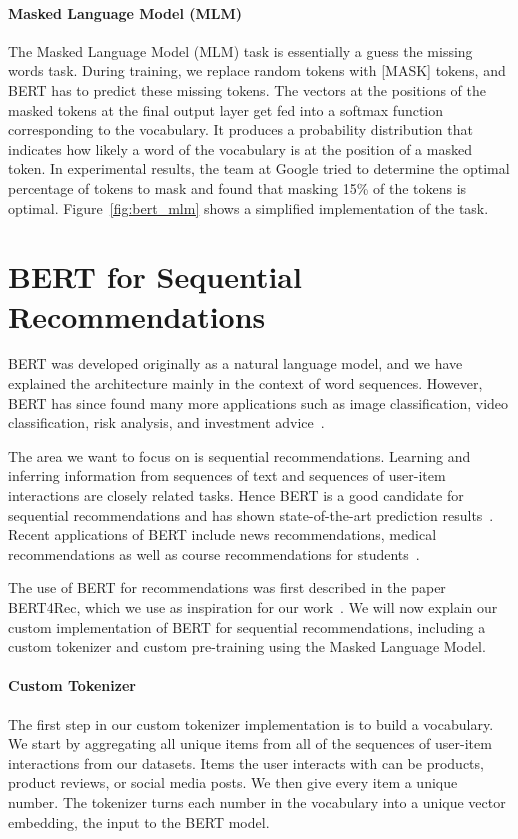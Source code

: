 \paragraph{Masked Language Model (MLM)}
The Masked Language Model (MLM) task is essentially a guess the missing words task. During training, we replace random tokens with [MASK] tokens, and BERT has to predict these missing tokens. The vectors at the positions of the masked tokens at the final output layer get fed into a softmax function corresponding to the vocabulary. It produces a probability distribution that indicates how likely a word of the vocabulary is at the position of a masked token. In experimental results, the team at Google tried to determine the optimal percentage of tokens to mask and found that masking 15\% of the tokens is optimal. Figure~\ref{fig:bert_mlm} shows a simplified implementation of the task.


\section{BERT for Sequential Recommendations}\label{sec:bert_recommendations}
BERT was developed originally as a natural language model, and we have explained the architecture mainly in the context of word sequences. However, BERT has since found many more applications such as image classification, video classification, risk analysis, and investment advice~\cite{sun2019learning,heidari2020semantic,he2019hsi}.

The area we want to focus on is sequential recommendations. Learning and inferring information from sequences of text and sequences of user-item interactions are closely related tasks. Hence BERT is a good candidate for sequential recommendations and has shown state-of-the-art prediction results~\cite{sun2019bert4rec}. Recent applications of BERT include news recommendations, medical recommendations as well as course recommendations for students~\cite{shao2021degree,shang2019pre,jia2021rmbert}.

The use of BERT for recommendations was first described in the paper BERT4Rec, which we use as inspiration for our work~\cite{sun2019bert4rec}. We will now explain our custom implementation of BERT for sequential recommendations, including a custom tokenizer and custom pre-training using the Masked Language Model. 

\paragraph{Custom Tokenizer}
The first step in our custom tokenizer implementation is to build a vocabulary. We start by aggregating all unique items from all of the sequences of user-item interactions from our datasets. Items the user interacts with can be products, product reviews, or social media posts. We then give every item a unique number. The tokenizer turns each number in the vocabulary into a unique vector embedding, the input to the BERT model.

